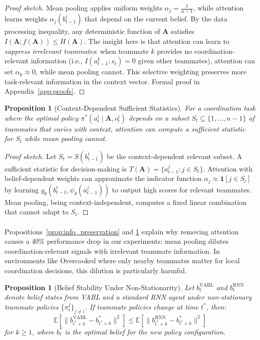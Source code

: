 \documentclass{article}
\theoremstyle{plain}
\newtheorem{proposition}[theorem]{Proposition}
\theoremstyle{definition}
\theoremstyle{remark}
\begin{document}
\begin{proof}[Proof sketch]
Mean pooling applies uniform weights $\alpha_j = \frac{1}{n-1}$, while attention learns weights $\alpha_j(b_{t-1}^i)$ that depend on the current belief. By the data processing inequality, any deterministic function of $\mathbf{A}$ satisfies $I(\mathbf{A}; f(\mathbf{A})) \leq H(\mathbf{A})$. The insight here is that attention can learn to \emph{suppress irrelevant teammates}: when teammate $k$ provides no coordination-relevant information (i.e., $I(a_{t-1}^k; s_t) = 0$ given other teammates), attention can set $\alpha_k \approx 0$, while mean pooling cannot. This selective weighting preserves more task-relevant information in the context vector. Formal proof in Appendix~\ref{app:proofs}.
\end{proof}

\begin{proposition}[Context-Dependent Sufficient Statistics]
\label{prop:sufficient_stat}
For a coordination task where the optimal policy $\pi^*(a_t^i \mid \mathbf{A}, o_t^i)$ depends on a subset $S_t \subseteq \{1, \ldots, n-1\}$ of teammates that varies with context, attention can compute a sufficient statistic for $S_t$ while mean pooling cannot.
\end{proposition}

\begin{proof}[Proof sketch]
Let $S_t = S(b_{t-1}^i)$ be the context-dependent relevant subset. A sufficient statistic for decision-making is $T(\mathbf{A}) = \{a_{t-1}^j : j \in S_t\}$. Attention with belief-dependent weights can approximate the indicator function $\alpha_j \approx \mathbf{1}[j \in S_t]$ by learning $g_\theta(b_{t-1}^i, \psi_\theta(a_{t-1}^j))$ to output high scores for relevant teammates. Mean pooling, being context-independent, computes a fixed linear combination that cannot adapt to $S_t$.
\end{proof}

\paragraph{}
Propositions~\ref{prop:info_preservation} and \ref{prop:sufficient_stat} explain why removing attention causes a 40\% performance drop in our experiments: mean pooling dilutes coordination-relevant signals with irrelevant teammate information. In environments like Overcooked where only nearby teammates matter for local coordination decisions, this dilution is particularly harmful.

\begin{proposition}[Belief Stability Under Non-Stationarity]
\label{prop:stability}
Let $b_t^{\mathrm{VABL}}$ and $b_t^{\mathrm{RNN}}$ denote belief states from VABL and a standard RNN agent under non-stationary teammate policies $\{\pi_t^j\}_{j \neq i}$. If teammate policies change at time $t^*$, then:
\begin{equation}
\mathbb{E}\left[\|b_{t^*+k}^{\mathrm{VABL}} - b_{t^*+k}^{*}\|^2\right] \leq \mathbb{E}\left[\|b_{t^*+k}^{\mathrm{RNN}} - b_{t^*+k}^{*}\|^2\right]
\end{equation}
for $k \geq 1$, where $b_t^*$ is the optimal belief for the new policy configuration.
\end{proposition}
\end{document}
